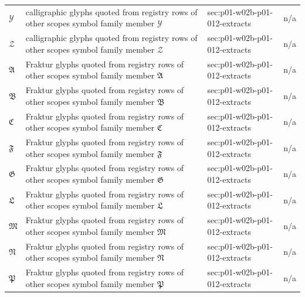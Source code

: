 \begin{longtable}{@{}p{}p{}p{}p{}@{}}
\(\mathcal Y\) & calligraphic glyphs quoted from registry rows of other scopes symbol family member \(\mathcal Y\) & sec:\allowbreak{}p01-\allowbreak{}w02b-\allowbreak{}p01-\allowbreak{}012-\allowbreak{}extracts & n/a \\
\(\mathcal Z\) & calligraphic glyphs quoted from registry rows of other scopes symbol family member \(\mathcal Z\) & sec:\allowbreak{}p01-\allowbreak{}w02b-\allowbreak{}p01-\allowbreak{}012-\allowbreak{}extracts & n/a \\
\(\mathfrak A\) & Fraktur glyphs quoted from registry rows of other scopes symbol family member \(\mathfrak A\) & sec:\allowbreak{}p01-\allowbreak{}w02b-\allowbreak{}p01-\allowbreak{}012-\allowbreak{}extracts & n/a \\
\(\mathfrak B\) & Fraktur glyphs quoted from registry rows of other scopes symbol family member \(\mathfrak B\) & sec:\allowbreak{}p01-\allowbreak{}w02b-\allowbreak{}p01-\allowbreak{}012-\allowbreak{}extracts & n/a \\
\(\mathfrak C\) & Fraktur glyphs quoted from registry rows of other scopes symbol family member \(\mathfrak C\) & sec:\allowbreak{}p01-\allowbreak{}w02b-\allowbreak{}p01-\allowbreak{}012-\allowbreak{}extracts & n/a \\
\(\mathfrak F\) & Fraktur glyphs quoted from registry rows of other scopes symbol family member \(\mathfrak F\) & sec:\allowbreak{}p01-\allowbreak{}w02b-\allowbreak{}p01-\allowbreak{}012-\allowbreak{}extracts & n/a \\
\(\mathfrak G\) & Fraktur glyphs quoted from registry rows of other scopes symbol family member \(\mathfrak G\) & sec:\allowbreak{}p01-\allowbreak{}w02b-\allowbreak{}p01-\allowbreak{}012-\allowbreak{}extracts & n/a \\
\(\mathfrak L\) & Fraktur glyphs quoted from registry rows of other scopes symbol family member \(\mathfrak L\) & sec:\allowbreak{}p01-\allowbreak{}w02b-\allowbreak{}p01-\allowbreak{}012-\allowbreak{}extracts & n/a \\
\(\mathfrak M\) & Fraktur glyphs quoted from registry rows of other scopes symbol family member \(\mathfrak M\) & sec:\allowbreak{}p01-\allowbreak{}w02b-\allowbreak{}p01-\allowbreak{}012-\allowbreak{}extracts & n/a \\
\(\mathfrak N\) & Fraktur glyphs quoted from registry rows of other scopes symbol family member \(\mathfrak N\) & sec:\allowbreak{}p01-\allowbreak{}w02b-\allowbreak{}p01-\allowbreak{}012-\allowbreak{}extracts & n/a \\
\(\mathfrak P\) & Fraktur glyphs quoted from registry rows of other scopes symbol family member \(\mathfrak P\) & sec:\allowbreak{}p01-\allowbreak{}w02b-\allowbreak{}p01-\allowbreak{}012-\allowbreak{}extracts & n/a \\

\end{longtable}
